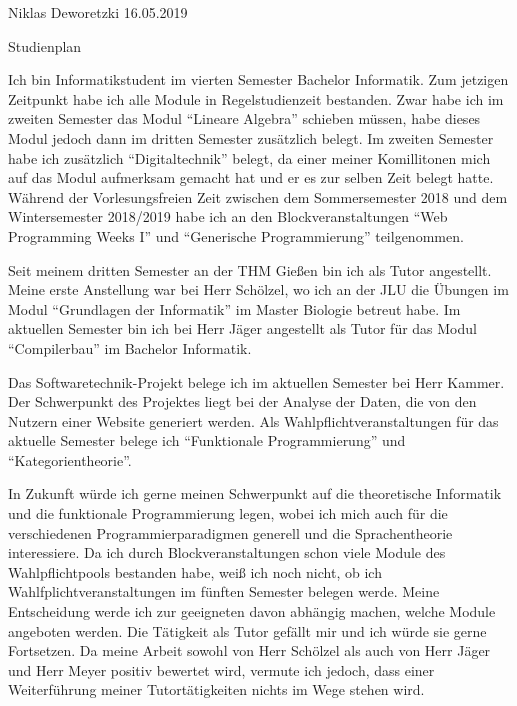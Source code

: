 \documentclass[11pt, parskip=half]{scrartcl}
\begin{document}
Niklas Deworetzki \hfill 16.05.2019

\begin{center}
  \begin{LARGE}
    Studienplan
  \end{LARGE}
\end{center}


Ich bin Informatikstudent im vierten Semester Bachelor Informatik.
Zum jetzigen Zeitpunkt habe ich alle Module in Regelstudienzeit bestanden.
Zwar habe ich im zweiten Semester das Modul ``Lineare Algebra'' schieben müssen, habe dieses Modul jedoch dann im dritten Semester zusätzlich belegt.
Im zweiten Semester habe ich zusätzlich ``Digitaltechnik'' belegt, da einer meiner Komillitonen mich auf das Modul aufmerksam gemacht hat und er es zur selben Zeit belegt hatte.
Während der Vorlesungsfreien Zeit zwischen dem Sommersemester 2018 und dem Wintersemester 2018/2019 habe ich an den Blockveranstaltungen ``Web Programming Weeks I'' und ``Generische Programmierung'' teilgenommen.

Seit meinem dritten Semester an der THM Gießen bin ich als Tutor angestellt.
Meine erste Anstellung war bei Herr Schölzel, wo ich an der JLU die Übungen im Modul ``Grundlagen der Informatik'' im Master Biologie betreut habe.
Im aktuellen Semester bin ich bei Herr Jäger angestellt als Tutor für das Modul ``Compilerbau'' im Bachelor Informatik.

Das Softwaretechnik-Projekt belege ich im aktuellen Semester bei Herr Kammer.
Der Schwerpunkt des Projektes liegt bei der Analyse der Daten, die von den Nutzern einer Website generiert werden.
Als Wahlpflichtveranstaltungen für das aktuelle Semester belege ich ``Funktionale Programmierung'' und ``Kategorientheorie''.

In Zukunft würde ich gerne meinen Schwerpunkt auf die theoretische Informatik und die funktionale Programmierung legen, wobei ich mich auch für die verschiedenen Programmierparadigmen generell und die Sprachentheorie interessiere.
Da ich durch Blockveranstaltungen schon viele Module des Wahlpflichtpools bestanden habe, weiß ich noch nicht, ob ich Wahlfplichtveranstaltungen im fünften Semester belegen werde.
Meine Entscheidung werde ich zur geeigneten davon abhängig machen, welche Module angeboten werden.
Die Tätigkeit als Tutor gefällt mir und ich würde sie gerne Fortsetzen.
Da meine Arbeit sowohl von Herr Schölzel als auch von Herr Jäger und Herr Meyer positiv bewertet wird, vermute ich jedoch, dass einer Weiterführung meiner Tutortätigkeiten nichts im Wege stehen wird.


 
\end{document}
